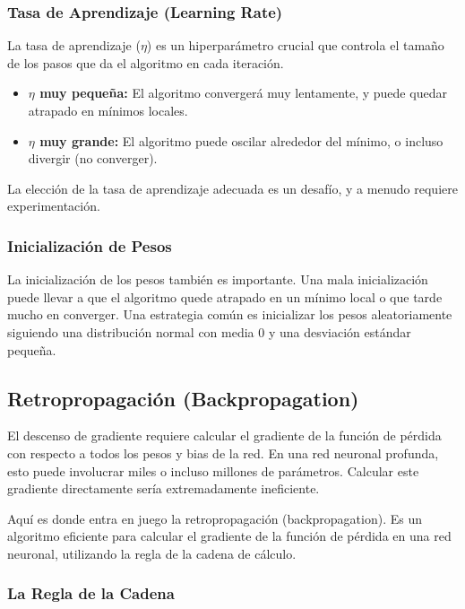 \documentclass{article}
\begin{document}
\subsubsection{Tasa de Aprendizaje (Learning Rate)}

La tasa de aprendizaje (\(\eta\)) es un hiperparámetro crucial que controla el tamaño de los pasos que da el algoritmo en cada iteración.

\begin{itemize}
    \item \textbf{\(\eta\) muy pequeña:} El algoritmo convergerá muy lentamente, y puede quedar atrapado en mínimos locales.
    \item \textbf{\(\eta\) muy grande:} El algoritmo puede oscilar alrededor del mínimo, o incluso divergir (no converger).
\end{itemize}

La elección de la tasa de aprendizaje adecuada es un desafío, y a menudo requiere experimentación.

\subsubsection{Inicialización de Pesos}
La inicialización de los pesos también es importante. Una mala inicialización puede llevar a que el algoritmo quede atrapado en un mínimo local o que tarde mucho en converger. Una estrategia común es inicializar los pesos aleatoriamente siguiendo una distribución normal con media 0 y una desviación estándar pequeña.

\subsection{Retropropagación (Backpropagation)}

El descenso de gradiente requiere calcular el gradiente de la función de pérdida con respecto a todos los pesos y bias de la red.  En una red neuronal profunda, esto puede involucrar miles o incluso millones de parámetros.  Calcular este gradiente directamente sería extremadamente ineficiente.

Aquí es donde entra en juego la retropropagación (backpropagation). Es un algoritmo eficiente para calcular el gradiente de la función de pérdida en una red neuronal, utilizando la regla de la cadena de cálculo.

\subsubsection{La Regla de la Cadena}
\end{document}
